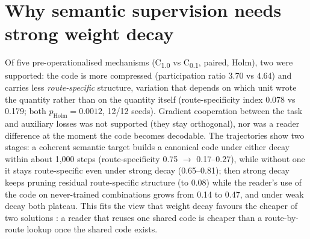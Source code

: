 \documentclass[11pt]{article}
\newcommand{\Cten}{C\textsubscript{1.0}}
\newcommand{\Cone}{C\textsubscript{0.1}}
\begin{document}
\section{Why semantic supervision needs strong weight decay}
Of five pre-operationalised mechanisms (\Cten{} vs \Cone, paired, Holm), two were supported: the code is more
compressed (participation ratio 3.70 vs 4.64) and carries less \emph{route-specific} structure, variation that
depends on which unit wrote the quantity rather than on the quantity itself (route-specificity index 0.078 vs 0.179;
both $p_\text{Holm}=0.0012$, 12/12 seeds). Gradient cooperation between the task and auxiliary losses was not
supported (they stay orthogonal), nor was a reader difference at the moment the code becomes decodable. The
trajectories show two stages: a coherent semantic target builds a canonical code under either decay within about
1,000 steps (route-specificity 0.75 $\to$ 0.17--0.27), while without one it stays route-specific even under strong
decay (0.65--0.81); then strong decay keeps pruning residual route-specific structure (to 0.08) while the reader's
use of the code on never-trained combinations grows from 0.14 to 0.47, and under weak decay both plateau. This fits
the view that weight decay favours the cheaper of two solutions \citep{varma2023efficiency}: a reader that reuses one
shared code is cheaper than a route-by-route lookup once the shared code exists.
\end{document}

